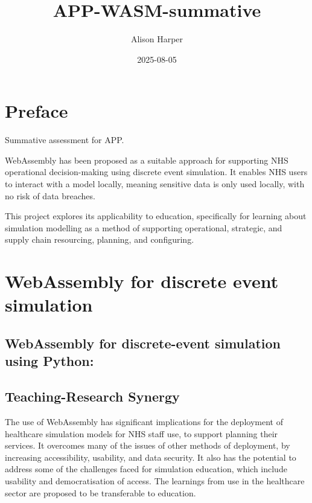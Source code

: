 \documentclass[
  letterpaper,
  DIV=11,
  numbers=noendperiod]{scrreprt}
\title{APP-WASM-summative}
\author{Alison Harper}
\date{2025-08-05}
\renewcommand*\contentsname{Table of contents}
\newcommand\contentsname{Table of contents}
\begin{document}
\maketitle

\renewcommand*\contentsname{Table of contents}
{
\hypersetup{linkcolor=}
\setcounter{tocdepth}{2}
\tableofcontents
}

\chapter*{Preface}\label{preface}


Summative assessment for APP.

WebAssembly has been proposed as a suitable approach for supporting NHS
operational decision-making using discrete event simulation. It enables
NHS users to interact with a model locally, meaning sensitive data is
only used locally, with no risk of data breaches.

This project explores its applicability to education, specifically for
learning about simulation modelling as a method of supporting
operational, strategic, and supply chain resourcing, planning, and
configuring.


\chapter{WebAssembly for discrete event
simulation}\label{webassembly-for-discrete-event-simulation}

\section{WebAssembly for discrete-event simulation using
Python:}\label{webassembly-for-discrete-event-simulation-using-python}

\section{Teaching-Research Synergy}\label{teaching-research-synergy}

The use of WebAssembly has significant implications for the deployment
of healthcare simulation models for NHS staff use, to support planning
their services. It overcomes many of the issues of other methods of
deployment, by increasing accessibility, usability, and data security.
It also has the potential to address some of the challenges faced for
simulation education, which include usability and democratisation of
access. The learnings from use in the healthcare sector are proposed to
be transferable to education.
\end{document}
